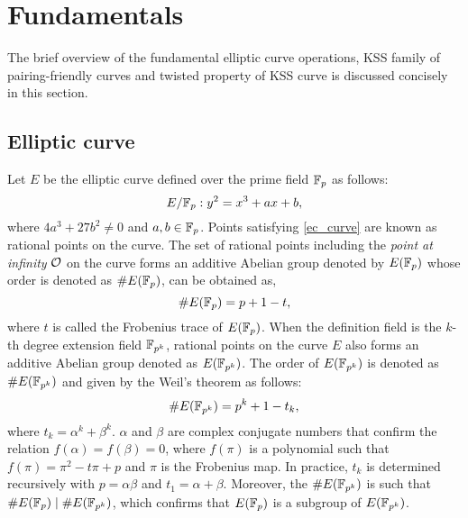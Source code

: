 \section{Fundamentals}
The brief overview of the fundamental elliptic curve operations, KSS family of pairing-friendly curves and twisted property of KSS curve is discussed concisely in this section.

\subsection{Elliptic curve \cite{washington2003elliptic}}
Let $E$ be the elliptic curve defined over the prime field ${\mathbb{F}}_{p}$  as follows:
\begin{equation}\label{ec_curve}
E/{\mathbb{F}}_{p} : y^2=x^3+ax+b,
\end{equation}
where $ 4a^3+27b^2 \neq 0$ and $a,b \in {\mathbb{F}}_{p}$. Points satisfying \eqref{ec_curve} are known as rational points on the curve.
The set of rational points including the \textit{point at infinity} $\cal{O}$ on the curve forms an additive Abelian group denoted by $E(\mathbb{F}_p)$ whose  order is denoted as $\#E({\mathbb{F}}_{p})$, can be obtained as,
\begin{equation}\label{order}
\#E({\mathbb{F}}_{p}) = p+1-t,
\end{equation} 
where $t$ is called the Frobenius trace of $E({\mathbb{F}}_{p})$.
When the definition field is the $k$-th degree extension field $\mathbb{F}_{p^k}$, rational points on the curve $E$ also forms an additive Abelian group denoted as $E(\mathbb{F}_{p^k})$. The order of $E(\mathbb{F}_{p^k})$ is denoted as $\#E(\mathbb{F}_{p^k})$ and given by the  Weil’s theorem \cite{DBLP:reference/crc/2005ehcc} as follows:
\begin{equation}
\#E(\mathbb{F}_{p^k}) = p^k +1- t_k,
\end{equation}
 where $t_k =  \alpha^k + \beta^k$.  $\alpha$ and $\beta$ are  complex conjugate numbers that confirm the relation $f(\alpha) = f(\beta) = 0$,  where $f(\pi)$ is a polynomial such that $f(\pi) = \pi^2 -t\pi + p$ and $\pi$ is the Frobenius map. In practice, $t_k$ is determined recursively with $p = \alpha\beta$ and $t_1 = \alpha + \beta$. Moreover, the  $\#E(\mathbb{F}_{p^k})$ is such that $\#E(\mathbb{F}_p)\mid \#E(\mathbb{F}_{p^k})$, which confirms that  $E(\mathbb{F}_p)$ is a subgroup of $E(\mathbb{F}_{p^k})$.

